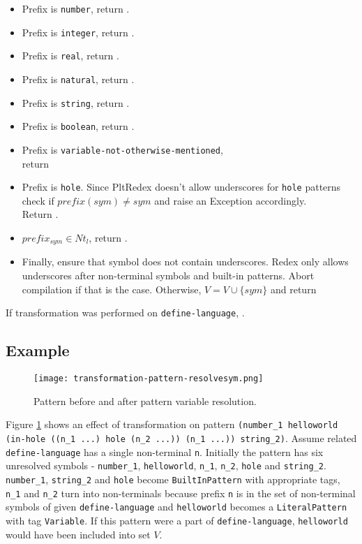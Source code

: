 \begin{itemize}
\item Prefix is \texttt{number}, return \BuiltInPattern[Number][$sym$][false].
\item Prefix is \texttt{integer}, return \BuiltInPattern[Integer][$sym$][false].
\item Prefix is \texttt{real}, return \BuiltInPattern[Real][$sym$][false].
\item Prefix is \texttt{natural}, return \BuiltInPattern[Natural][$sym$][false].
\item Prefix is \texttt{string}, return \BuiltInPattern[String][$sym$][false].
\item Prefix is \texttt{boolean}, return \BuiltInPattern[Boolean][$sym$][false].
\item Prefix is \texttt{variable-not-otherwise-mentioned}, \\ return \BuiltInPattern[Variable][$sym$][false]
\item Prefix is \texttt{hole}. Since PltRedex doesn't allow underscores for \texttt{hole} patterns check if $prefix(sym) \neq sym$ and raise an Exception accordingly. \\ Return \BuiltInPattern[Hole][$sym$][false].
\item $prefix_{sym} \in Nt_l$, return .
\item Finally, ensure that symbol does not contain underscores. Redex only allows underscores after non-terminal symbols and built-in patterns. Abort compilation if that is the case. Otherwise, $V=V\cup\{sym\}$ and return \LiteralPattern[Variable][$sym$][false]
\end{itemize}
If transformation was performed on \texttt{define-language}, .

\subsection{Example}

\begin{figure}[H]
\texttt{[image: transformation-pattern-resolvesym.png]}
\caption{Pattern before and after pattern variable resolution.}
\label{transformation-pattern-resolvesym}
\end{figure}

Figure \ref{transformation-pattern-resolvesym} shows an effect of transformation on pattern \texttt{(number\_1 helloworld (in-hole ((n\_1 ...) hole (n\_2 ...)) (n\_1 ...)) string\_2)}. Assume related \texttt{define-language} has a single non-terminal \texttt{n}. Initially the pattern has six unresolved symbols - \texttt{number\_1}, \texttt{helloworld}, \texttt{n\_1}, \texttt{n\_2}, \texttt{hole} and \texttt{string\_2}. \texttt{number\_1}, \texttt{string\_2} and \texttt{hole} become \texttt{BuiltInPattern} with appropriate tags,  \texttt{n\_1} and \texttt{n\_2} turn into non-terminals because prefix \texttt{n} is in the set of non-terminal symbols of given \texttt{define-language} and \texttt{helloworld} becomes a \texttt{LiteralPattern} with tag \texttt{Variable}. If this pattern were a part of \texttt{define-language}, \texttt{helloworld} would have been included into set $V$.
